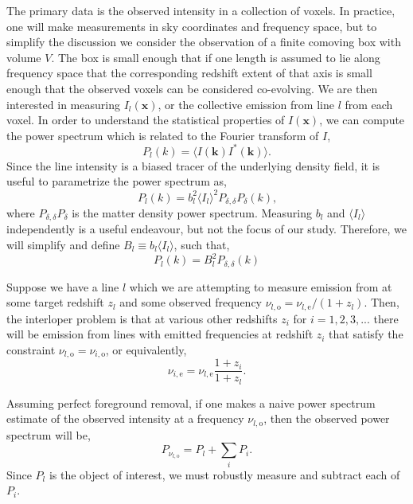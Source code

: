 \documentclass{aastex62}
\newcommand{\beq}{\begin{equation}}
\newcommand{\eeq}{\end{equation}}
\newcommand{\mynu}[2]{\ensuremath{\nu_{#1,\text{#2}}}}
\newcommand{\denps}{\ensuremath{P_{\delta,\delta}}}
\newcommand{\avg}[1]{\ensuremath{\langle #1 \rangle}}
\begin{document}
The primary data is the observed intensity in a collection of voxels. In
practice, one will make measurements in sky coordinates and frequency space,
but to simplify the discussion we consider the observation of a finite
comoving box with volume $V$. The box is small enough that if one length is
assumed to lie along frequency space that the corresponding redshift extent of
that axis is small enough that the observed voxels can be considered
co-evolving. We are then interested in measuring $I_{l}(\bm{x})$, or the
collective emission from line $l$ from each voxel. In order to understand the
statistical properties of $I(\bm{x})$, we can compute the power spectrum which
is related to the Fourier transform of $I$,
\beq
P_{l}(k) = \avg{I(\bm{k}) I^{*}(\bm{k})}\text{.}
\eeq
Since the line intensity is a biased tracer of the underlying density field,
it is useful to parametrize the power spectrum as,
\beq
P_l(k) = b_l^2 \avg{I_l}^2 \denps{P_{\delta}}(k)\text{,}
\eeq
where $\denps{P_{\delta}}$ is the matter density power spectrum. Measuring
$b_l$ and $\avg{I_l}$ independently is a useful endeavour, but not the focus
of our study. Therefore, we will simplify and define $B_l \equiv b_l
\avg{I_l}$, such that,
\beq
P_{l}(k) = B_l^2 \denps(k)
\eeq

Suppose we have a line $l$ which we are attempting to measure emission from at
some target redshift $z_l$ and some observed frequency $\mynu{l}{o} =
\mynu{l}{e}/(1+z_l)$. Then, the interloper problem is that at various other
redshifts $z_i$ for $i=1,2,3,...$ there will be emission from lines with
emitted frequencies at redshift $z_i$ that satisfy the constraint $\mynu{l}{o}
= \mynu{i}{o}$, or equivalently,
\beq
\mynu{i}{e} = \mynu{l}{e}\frac{1+z_i}{1+z_l}\text{.}
\eeq

Assuming perfect foreground removal, if one makes a naive power spectrum
estimate of the observed intensity at a frequency $\mynu{l}{o}$, then the
observed power spectrum will be,
\beq\label{eq:observed_with_int}
P_{\mynu{l}{o}} = P_{l} + \sum_{i} P_{i}\text{.}
\eeq
Since $P_l$ is the object of interest, we must robustly measure and subtract
each of $P_i$.



\end{document}
